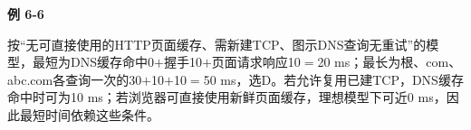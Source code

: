 {\color{ink}\bfseries 例 6-6}\par\vspace{1bp}按“无可直接使用的HTTP页面缓存、需新建TCP、图示DNS查询无重试”的模型，最短为DNS缓存命中0\(+\allowbreak{}\)握手10\(+\allowbreak{}\)页面请求响应10\(=\allowbreak{}\)20 ms；最长为根、com、abc.com各查询一次的30\(+\allowbreak{}\)10\(+\allowbreak{}\)10\(=\allowbreak{}\)50 ms，选D。若允许复用已建TCP，DNS缓存命中时可为10 ms；若浏览器可直接使用新鲜页面缓存，理想模型下可近0 ms，因此最短时间依赖这些条件。
